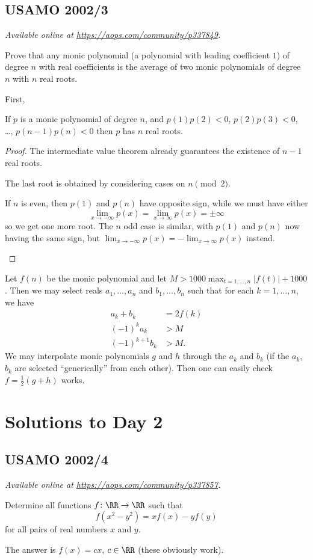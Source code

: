 \documentclass[11pt]{scrartcl}
\begin{document}
\subsection{USAMO 2002/3}
\textsl{Available online at \url{https://aops.com/community/p337849}.}
\begin{mdframed}[style=mdpurplebox,frametitle={Problem statement}]
Prove that any monic polynomial (a polynomial with leading coefficient $1$)
of degree $n$ with real coefficients is the average
of two monic polynomials of degree $n$ with $n$ real roots.
\end{mdframed}
First,
\begin{lemma*}
  If $p$ is a monic polynomial of degree $n$,
  and $p(1)p(2) < 0$, $p(2)p(3) < 0$, \dots, $p(n-1)p(n) < 0$
  then $p$ has $n$ real roots.
\end{lemma*}
\begin{proof}
  The intermediate value theorem already guarantees
  the existence of $n-1$ real roots.

  The last root is obtained by considering cases on $n \pmod 2$.
  \begin{itemize}
  \ii If $n$ is even, then $p(1)$ and $p(n)$ have opposite sign,
  while we must have either
  \[ \lim_{x \to -\infty} p(x) = \lim_{x \to \infty} p(x) = \pm \infty \]
  so we get one more root.
  \ii The $n$ odd case is similar,
  with $p(1)$ and $p(n)$ now having the same sign,
  but $\lim_{x \to -\infty} p(x) = -\lim_{x \to \infty} p(x)$ instead. \qedhere
 \end{itemize}
\end{proof}

Let $f(n)$ be the monic polynomial and let
$M > 1000\max_{t=1, \dots, n} |f(t)|+1000$.
Then we may select reals $a_1, \dots, a_n$ and $b_1, \dots, b_n$
such that for each $k = 1, \dots, n$, we have
\begin{align*}
  a_k + b_k &= 2f(k) \\
  (-1)^k a_k & > M \\
  (-1)^{k+1} b_k & > M.
\end{align*}
We may interpolate monic polynomials $g$ and $h$ through the $a_k$ and $b_k$
(if the $a_k$, $b_k$ are selected ``generically'' from each other).
Then one can easily check $f = \tfrac12(g+h)$ works.
\pagebreak

\section{Solutions to Day 2}
\subsection{USAMO 2002/4}
\textsl{Available online at \url{https://aops.com/community/p337857}.}
\begin{mdframed}[style=mdpurplebox,frametitle={Problem statement}]
Determine all functions $f \colon \RR \to \RR$ such that
\[ f(x^2 - y^2) = x f(x) - y f(y) \]
for all pairs of real numbers $x$ and $y$.
\end{mdframed}
The answer is $f(x) = cx$, $c \in \RR$ (these obviously work).
\end{document}
